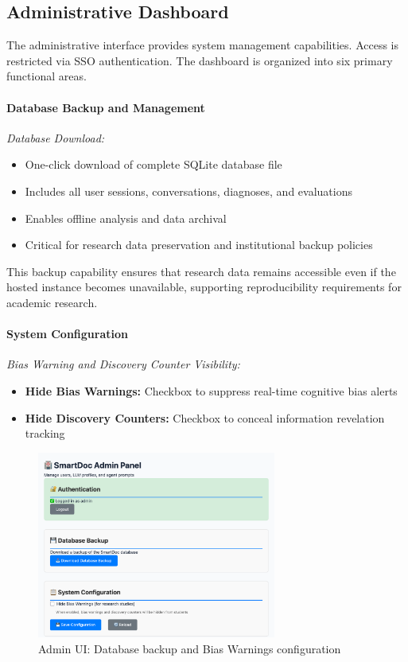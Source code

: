 \subsection{Administrative Dashboard}
\label{subsec:ui-admin}

The administrative interface provides system management capabilities. Access is restricted via SSO authentication. The dashboard is organized into six primary functional areas.

\paragraph{Database Backup and Management}
\textit{Database Download:}
\begin{itemize}
  \item One-click download of complete SQLite database file
  \item Includes all user sessions, conversations, diagnoses, and evaluations
  \item Enables offline analysis and data archival
  \item Critical for research data preservation and institutional backup policies
\end{itemize}
This backup capability ensures that research data remains accessible even if the hosted instance becomes unavailable, supporting reproducibility requirements for academic research.

\paragraph{System Configuration}
\textit{Bias Warning and Discovery Counter Visibility:}
\begin{itemize}
  \item \textbf{Hide Bias Warnings:} Checkbox to suppress real-time cognitive bias alerts
  \item \textbf{Hide Discovery Counters:} Checkbox to conceal information revelation tracking
\end{itemize}

\begin{figure}[h]
  \centering
  \includegraphics[width=0.7\textwidth]{figures/ui/ui_set1.png}
  \caption{Admin UI: Database backup and Bias Warnings configuration}
  \label{fig:ui-set1}
\end{figure}


